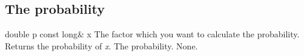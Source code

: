 \vspace*{10mm}

\subsection{The probability}

\setConstInstance
\printMethodWithOneParam
{double}
{p}
{const long\&}
{x}
{The factor which you want to calculate the probability.}
{Returns the probability of {\em x}.}
{The probability.}
{None.}


